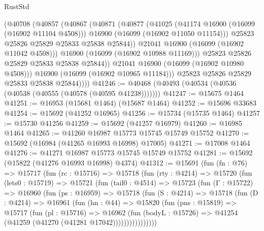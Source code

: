 \begin{lexlean}{RustStd}
\begin{coremodule}
                  (@40708
                    (@40857
                      (@40867
                        (@40871
                          (@40877
                            (@41025
                              (@41174 @16900 (@16099 (@16902 @11104 @4508)))
                              @16900
                              (@16099 (@16902 @11050 @11154)))
                            @25823
                            @25826
                            @25829
                            @25833
                            @25838
                            @25844))
                        @21041
                        @16900
                        (@16099 (@16902 @11042 @4508)))
                      @16900
                      (@16099 (@16902 @10988 @11169)))
                    @25823
                    @25826
                    @25829
                    @25833
                    @25838
                    @25844))
                @21041
                @16900
                (@16099 (@16902 @10980 @4508)))
              @16900
              (@16099 (@16902 @10965 @11184)))
            @25823
            @25826
            @25829
            @25833
            @25838
            @25844))))
@41246 := @40468 (@40493 (@40534 (@40536 (@40538 (@40555 (@40578 (@40595 @41238)))))))
@41247 := @15675 @1464
@41251 := @16953 (@15681 @1464) (@15687 @1464)
@41252 := @15696 @33683
@41254 := @15692 (@41252 @16965)
@41256 := @15734 (@15735 @1464)
@41257 := @15730 @41256
@41259 := @15692 (@41257 @16979)
@41260 := @16985 @1464
@41265 := @41260 @16987 @15773 @15745 @15749 @15752
@41270 := @15692 (@16984 (@41265 @16993 @16998) @17005)
@41271 := @17008 @1464
@41276 := @41271 @16987 @15773 @15745 @15749 @15752
@41281 := @15692 (@15822 (@41276 @16993 @16998) @4374)
@41312 := @15691
    (fun (fn : @76) =>
    @15717
      (fun (rc : @15716) =>
      @15718
        (fun (rty : @4214) =>
        @15720
          (fun (lets0 : @15719) =>
          @15721
            (fun (tail0 : @4514) =>
            @15723
              (fun (Γ : @15722) =>
              @16960
                (fun (ps : @16959) =>
                @15718
                  (fun (S : @4214) =>
                  @15718
                    (fun (D : @4214) =>
                    @16961
                      (fun (hn : @44) =>
                      @15820
                        (fun (pns : @15819) =>
                        @15717
                          (fun (pl : @15716) =>
                          @16962
                            (fun (bodyL : @15726) =>
                            @41254 (@41259 (@41270 (@41281 @17042))))))))))))))))

\end{coremodule}
\end{lexlean}
